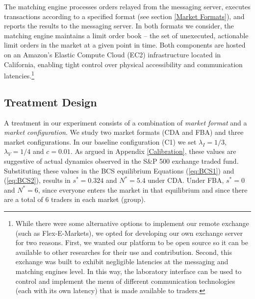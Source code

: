 \documentclass[12pt]{article}
\begin{document}
The matching engine processes orders relayed from the messaging server, executes transactions according to a specified format (see section \ref{Market Formats}), and reports the results to the messaging server. In both formats we consider, the matching engine maintains a limit order book -- the set of unexecuted, actionable limit orders in the market at a given point in time. Both components are hosted on an Amazon’s Elastic Compute Cloud (EC2) infrastructure located in California, enabling tight control over physical accessibility and communication latencies.\footnote{While there were some alternative options to implement our remote exchange (such as Flex-E-Markets), we opted for developing our own exchange server for two reasons. First, we wanted our platform to be open source so it can be available to other researches for their use and contribution. Second, this exchange was built to exhibit negligible latencies at the messaging and matching engines level. In this way, the laboratory interface can be used to control and implement the menu of different communication technologies (each with its own latency) that is made available to traders.}


\subsection{Treatment Design}
\label{sec:treatments}

A treatment in our experiment consists of a combination of \textit{market format} and a \textit{market configuration}. We study two market formats (CDA and FBA) and three market configurations. In our baseline configuration (C1)  we set $\lambda_I=1/3$, $\lambda_V=1/4$ and $c=0.01$. As argued in Appendix \ref{Calibration}, these values are suggestive of actual dynamics observed in the S\&P 500 exchange traded fund. Substituting these values in the BCS equilibrium Equations (\ref{eq:BCS1}) and (\ref{eq:BCS2}), results in $s^* =  0.324$ and $N^*=5.4$ under CDA. Under FBA, $s^* = 0$ and $N^*=6$, since everyone enters the market in that equilibrium and since there are a total of 6 traders in each market (group). 
\end{document}
